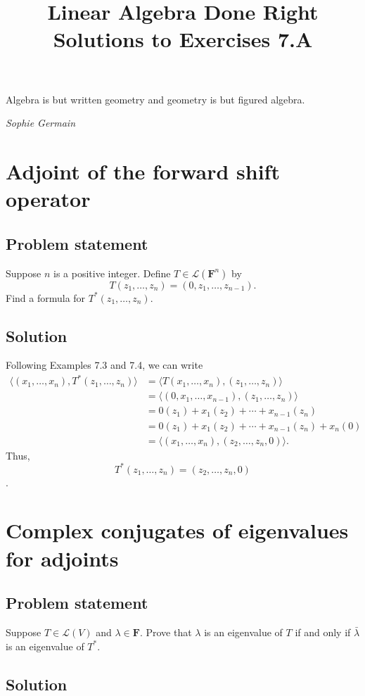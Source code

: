 \documentclass{article}
\title{Linear Algebra Done Right\\Solutions to Exercises 7.A}
\author{}
\date{}
\begin{document}
\maketitle

\epigraph{Algebra is but written geometry and geometry is but figured algebra.}{\textit{Sophie Germain}}

\section{Adjoint of the forward shift operator}
\subsection*{Problem statement}
Suppose $n$ is a positive integer. Define $T\in\mathcal{L}(\mathbf{F}^{n})$ by
\[T(z_1,\ldots,z_n)=(0,z_1,\ldots,z_{n-1}).\]
Find a formula for $T^*(z_1,\ldots,z_n)$.

\subsection*{Solution}
Following Examples 7.3 and 7.4, we can write
\begin{align*} 
\langle(x_1,\ldots,x_n),T^*(z_1,\ldots,z_n)\rangle &= \langle T(x_1,\ldots,x_n),(z_1,\ldots,z_n)\rangle \\ 
 &= \langle (0,x_1,\ldots,x_{n-1}),(z_1,\ldots,z_n)\rangle \\
 &= 0(z_1) + x_1(z_2) + \cdots + x_{n-1}(z_n) \\
 &= 0(z_1) + x_1(z_2) + \cdots + x_{n-1}(z_n) + x_n(0) \\
 &= \langle (x_1,\ldots,x_n),(z_2,\ldots,z_n,0)\rangle.
\end{align*}
Thus,
\[T^*(z_1,\ldots,z_n)=(z_2,\ldots,z_n,0)\].

\clearpage

\section{Complex conjugates of eigenvalues for adjoints}
\subsection*{Problem statement}
Suppose $T\in\mathcal{L}(V)$ and $\lambda\in\mathbf{F}$. Prove that $\lambda$ is an eigenvalue of $T$ if and only if $\bar{\lambda}$ is an eigenvalue of $T^*$.

\subsection*{Solution}
\end{document}
